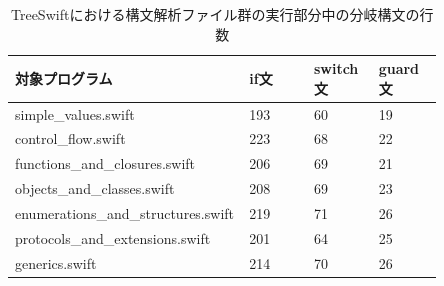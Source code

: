 \begin{table}[!hbtp]
    \begin{center}
        \caption{TreeSwiftにおける構文解析ファイル群の実行部分中の分岐構文の行数}
        \begin{tabular}{|p{0.4\linewidth}|p{0.15\linewidth}|p{0.15\linewidth}|p{0.15\linewidth}|}
            \hline
            対象プログラム & if文 & switch文 & guard文\\
            \hline
            \hline
            simple\_values.swift & 193 & 60 & 19\\
            \hline
            control\_flow.swift & 223 & 68 & 22\\
            \hline
            functions\_and\_closures.swift & 206 & 69 & 21\\
            \hline
            objects\_and\_classes.swift & 208 & 69 & 23\\
            \hline
            enumerations\_and\_structures.swift & 219 & 71 & 26\\
            \hline
            protocols\_and\_extensions.swift & 201 & 64 & 25\\
            \hline
            generics.swift & 214 & 70 & 26\\
            \hline
        \end{tabular}
        \label{table:branching-method-treeswift}
    \end{center}
\end{table}

